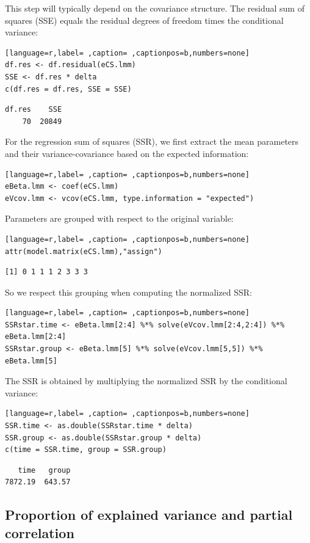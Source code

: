 \documentclass[12pt]{article}
\begin{document}
This step will typically depend on the covariance structure. The
residual sum of squares (SSE) equals the residual degrees of freedom
times the conditional variance:
\begin{lstlisting}[language=r,label= ,caption= ,captionpos=b,numbers=none]
df.res <- df.residual(eCS.lmm)
SSE <- df.res * delta
c(df.res = df.res, SSE = SSE)
\end{lstlisting}

\begin{verbatim}
df.res    SSE 
    70  20849
\end{verbatim}


For the regression sum of squares (SSR), we first extract the mean
parameters and their variance-covariance based on the expected
information:
\begin{lstlisting}[language=r,label= ,caption= ,captionpos=b,numbers=none]
eBeta.lmm <- coef(eCS.lmm)
eVcov.lmm <- vcov(eCS.lmm, type.information = "expected")
\end{lstlisting}

Parameters are grouped with respect to the original variable:
\begin{lstlisting}[language=r,label= ,caption= ,captionpos=b,numbers=none]
attr(model.matrix(eCS.lmm),"assign")
\end{lstlisting}

\begin{verbatim}
[1] 0 1 1 1 2 3 3 3
\end{verbatim}


\bigskip

So we respect this grouping when computing the normalized SSR: 
\begin{lstlisting}[language=r,label= ,caption= ,captionpos=b,numbers=none]
SSRstar.time <- eBeta.lmm[2:4] %*% solve(eVcov.lmm[2:4,2:4]) %*% eBeta.lmm[2:4] 
SSRstar.group <- eBeta.lmm[5] %*% solve(eVcov.lmm[5,5]) %*% eBeta.lmm[5] 
\end{lstlisting}
The SSR is obtained by multiplying the normalized SSR by the
conditional variance:
\begin{lstlisting}[language=r,label= ,caption= ,captionpos=b,numbers=none]
SSR.time <- as.double(SSRstar.time * delta)
SSR.group <- as.double(SSRstar.group * delta)
c(time = SSR.time, group = SSR.group)
\end{lstlisting}
\begin{verbatim}
   time   group 
7872.19  643.57
\end{verbatim}

\subsection{Proportion of explained variance and partial correlation}
\label{sec:org4c8a072}
\end{document}
